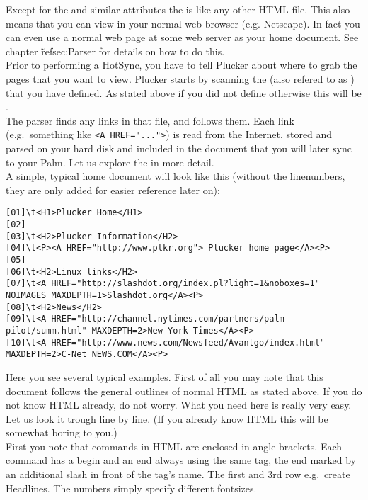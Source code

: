 Except for the  and similar
attributes the  is like any other HTML file.
This also means that you can view  in your normal
web browser (e.g. Netscape). In fact you can even use a normal
web page at some web server as your home document. See chapter
\~ref{sec:Parser} for details on how to do this.\\

Prior to performing a HotSync, you have to tell Plucker about where to
grab the pages that you want to view. Plucker starts by scanning the
 (also refered to as ) that
you have defined. As stated above if you did not define otherwise this
will be . \\

The parser finds any links in that file, and follows them. Each link
(e.g.\ something like \verb|<A HREF="...">|) is read from the Internet,
stored and parsed on your hard disk and included in the document that
you will later sync to your Palm. Let us explore the  in more detail.\\

A simple, typical home document will look like this (without the
linenumbers, they are only added for easier reference later on):\\

\begin{verbatim}
[01]\t<H1>Plucker Home</H1>
[02]
[03]\t<H2>Plucker Information</H2>
[04]\t<P><A HREF="http://www.plkr.org"> Plucker home page</A><P>
[05]
[06]\t<H2>Linux links</H2>
[07]\t<A HREF="http://slashdot.org/index.pl?light=1&noboxes=1" NOIMAGES MAXDEPTH=1>Slashdot.org</A><P>
[08]\t<H2>News</H2>
[09]\t<A HREF="http://channel.nytimes.com/partners/palm-pilot/summ.html" MAXDEPTH=2>New York Times</A><P>
[10]\t<A HREF="http://www.news.com/Newsfeed/Avantgo/index.html" MAXDEPTH=2>C-Net NEWS.COM</A><P>
\end{verbatim}

Here you see several typical examples. First of all you may note that
this document follows the general outlines of normal HTML as stated
above. If you do not know HTML already, do not worry. What you need
here is really very easy. Let us look it trough line by line. (If you
already know HTML this will be somewhat boring to you.)\\

First you note that commands in HTML are enclosed in angle brackets.
Each command has a begin and an end always using the same tag, the
end marked by an additional slash in front of the tag's name. The first
and 3rd row e.g.\ create Headlines. The numbers simply specify different 
fontsizes.\\

